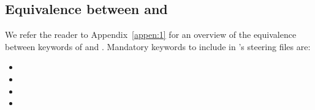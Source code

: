 \subsection{Equivalence between \gaia{} and \sisyphe{}}
We refer the reader to Appendix~\ref{appen:1} for an overview of the equivalence between keywords of \sisyphe{} and \gaia{}. Mandatory keywords to include in \gaia{}'s steering files are:
\begin{itemize}
\item {}
\item {}
\item {}
\item {}
\end{itemize}

